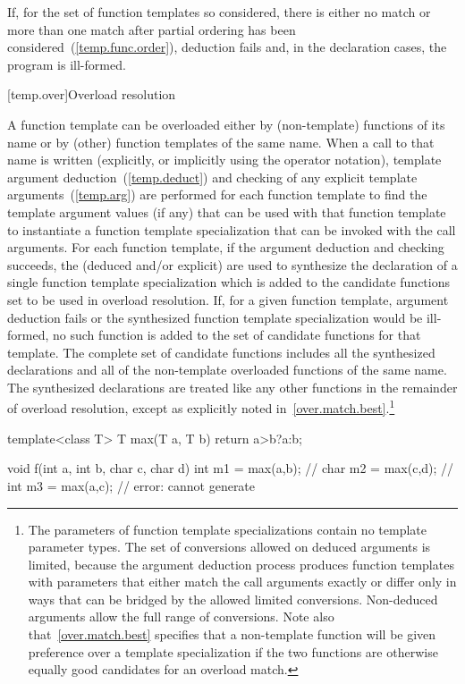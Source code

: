 \pnum
If, for the set of function templates so considered, there is either no match or
more than one match after partial ordering has been considered~(\ref{temp.func.order}),
deduction fails and, in the declaration cases, the
program is ill-formed.

[temp.over]{Overload resolution}

\pnum
{}%
A function template can be overloaded either by (non-template) functions of its
name or by (other) function templates of the same name.
When a call to that name is written (explicitly, or implicitly using the
operator notation), template argument deduction~(\ref{temp.deduct})
and checking of any explicit template arguments~(\ref{temp.arg}) are performed
for each function template to find the template argument values (if any) that
can be used with that function template to instantiate a function template
specialization that can be invoked with the call arguments.
For each function template, if the argument deduction and checking succeeds,
the
(deduced and/or explicit)
are used to synthesize the declaration of
a single function template specialization which is
added to the candidate functions set to be used in overload resolution.
If, for a given function template, argument deduction fails or
the synthesized function template specialization would be ill-formed,
no such function is added to the set of candidate functions for that template.
The complete set of candidate functions includes all the synthesized
declarations and all of the non-template overloaded functions of
the same name.
The synthesized declarations are
treated like any other functions in
the remainder of overload resolution, except as explicitly noted
in~\ref{over.match.best}.\footnote{The parameters of function template
specializations contain no
template parameter types.
The set of conversions allowed on deduced arguments is limited, because the
argument deduction process produces function templates with parameters that
either match the call arguments exactly or differ only in ways that can be
bridged by the allowed limited conversions.
Non-deduced arguments allow the full range of conversions.
Note also that~\ref{over.match.best} specifies that a non-template function will
be given preference over a template specialization if the two functions
are otherwise equally good candidates for an overload match.}

\enterexample
\begin{codeblock}
template<class T> T max(T a, T b) { return a>b?a:b; }

void f(int a, int b, char c, char d) {
  int m1 = max(a,b);            // 
  char m2 = max(c,d);           // 
  int m3 = max(a,c);            // error: cannot generate 
}
\end{codeblock}

